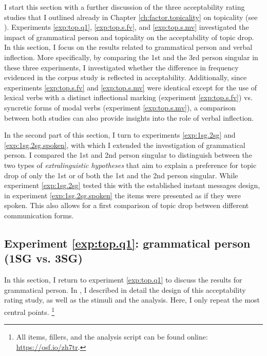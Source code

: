 I start this section with a further discussion of the three acceptability rating studies that I outlined already in Chapter \ref{ch:factor.topicality} on topicality (see ).
Experiments \ref*{exp:top.q1}, \ref*{exp:top.s.fv}, and \ref*{exp:top.s.mv} investigated the impact of grammatical person and topicality on the acceptability of topic drop.
In this section, I focus on the results related to grammatical person and verbal inflection.
More specifically, by comparing the 1st and the 3rd person singular in these three experiments, I investigated whether the difference in frequency evidenced in the corpus study is reflected in acceptability.
Additionally, since experiments  \ref*{exp:top.s.fv} and \ref*{exp:top.s.mv} were identical except for the use of lexical verbs  with a distinct inflectional marking (experiment \ref*{exp:top.s.fv}) vs. syncretic forms of modal verbs (experiment \ref*{exp:top.s.mv}), a comparison between both studies can also provide insights into the role of verbal inflection. 

In the second part of this section, I turn to experiments \ref*{exp:1sg.2sg} and \ref*{exp:1sg.2sg.spoken}, with which I extended the investigation of grammatical person.
I compared the 1st and 2nd person singular to distinguish between the two types of \textit{extralinguistic hypotheses} that aim to explain a preference for topic drop of only the 1st or of both the 1st and the 2nd person singular.
While experiment \ref*{exp:1sg.2sg} tested this with the established instant messages design, in experiment \ref*{exp:1sg.2sg.spoken} the items were presented as if they were spoken.
This also allows for a first comparison of topic drop between different communication forms.

\subsection{Experiment \ref*{exp:top.q1}: grammatical person (1SG vs. 3SG) }
\label{sec:exp.top.q1.person}
In this section, I return to experiment \ref*{exp:top.q1} to discuss the results for grammatical person.
In , I described in detail the design of this acceptability rating study, as well as the stimuli and the analysis.
Here, I only repeat the most central points.%
\footnote{All items, fillers, and the analysis script can be found online: \url{https://osf.io/zh7tr}.}
%


